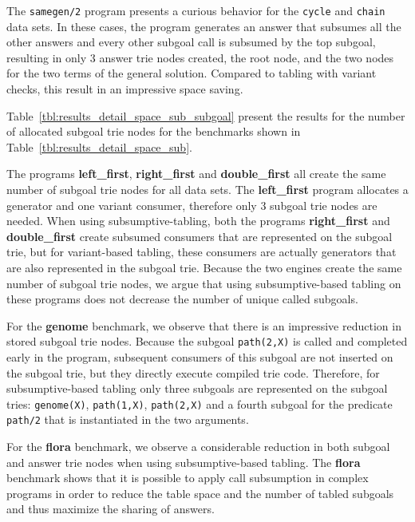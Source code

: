 

The \texttt{samegen/2} program presents a curious behavior for the \texttt{cycle} and \texttt{chain}
data sets. In these cases, the program generates an answer that subsumes all the other answers and
every other subgoal call is subsumed by the top subgoal, resulting in only 3 answer trie nodes created,
the root node, and the two nodes for the two terms of the general solution. Compared to tabling with
variant checks, this result in an impressive space saving.

Table~\ref{tbl:results_detail_space_sub_subgoal} present the results for the number of
allocated subgoal trie nodes for the benchmarks shown in Table~\ref{tbl:results_detail_space_sub}.



The programs \textbf{left\_first},
\textbf{right\_first} and \textbf{double\_first} all create the same number of subgoal trie nodes
for all data sets. The \textbf{left\_first} program allocates a generator and one variant consumer,
therefore only 3 subgoal trie nodes are needed.
When using subsumptive-tabling, both the
programs \textbf{right\_first} and \textbf{double\_first} create subsumed consumers that are
represented on the subgoal trie, but for variant-based tabling, these consumers are actually
generators that are also represented in the subgoal trie. Because the two engines create the same
number of subgoal trie nodes, we argue that using subsumptive-based tabling on these programs
does not decrease the number of unique called subgoals.

For the \textbf{genome} benchmark, we observe that there is an impressive reduction in stored
subgoal trie nodes. Because the subgoal \texttt{path(2,X)} is called and completed early in the
program, subsequent consumers of this subgoal are not inserted on the subgoal trie, but they
directly execute compiled trie code. Therefore, for subsumptive-based tabling only three subgoals
are represented on the subgoal tries: \texttt{genome(X)}, \texttt{path(1,X)}, \texttt{path(2,X)}
and a fourth subgoal for the predicate \texttt{path/2} that is instantiated in the two arguments.

For the \textbf{flora} benchmark, we observe a considerable reduction in both subgoal and answer trie nodes
when using subsumptive-based tabling. The \textbf{flora} benchmark shows that it is possible to
apply call subsumption in complex programs in order to reduce the table space and the number of
tabled subgoals and thus maximize the sharing of answers.

